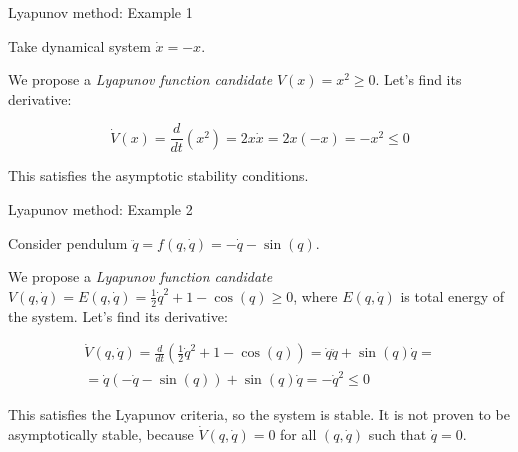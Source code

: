 \documentclass{beamer}
\begin{document}
\begin{frame}{Lyapunov method: Example 1}
\begin{flushleft}

Take dynamical system $\dot{x} = -x$. 

\bigskip

We propose a \emph{Lyapunov function candidate} $V(x) = x^2 \geq 0$. Let's find its derivative:

\begin{equation}
    \dot V(x) = 
    \frac{d}{dt}(  x^2  ) = 
    2x \dot x =
    2x (-x) =
    -x^2 \leq 0
\end{equation}

This satisfies the asymptotic stability conditions.

\end{flushleft}
\end{frame}



\begin{frame}{Lyapunov method: Example 2}
	\begin{flushleft}
		
		Consider pendulum $\ddot{q} = f(q, \dot{q}) = -\dot{q} - \sin(q)$. 
		
		\bigskip
		
		We propose a \emph{Lyapunov function candidate} $V(q, \dot{q}) = E(q, \dot{q}) = \frac{1}{2} \dot{q}^2 + 1 - \cos(q)\geq 0$, where $E(q, \dot{q})$ is total energy of the system. Let's find its derivative:
		
		
		\begin{align}
			\dot V(q, \dot{q}) = 
			\frac{d}{dt} (\frac{1}{2} \dot{q}^2 + 1 - \cos(q)) =
			\dot{q} \ddot{q} + \sin(q)\dot{q} = \\
			=
			\dot{q} (-\dot{q} - \sin(q)) + \sin(q)\dot{q}
			=
			-\dot{q}^2 \leq 0
		\end{align}
		
		This satisfies the Lyapunov criteria, so the system is stable. It is not proven to be asymptotically stable, because $\dot V(q, \dot{q}) = 0$ for all $(q, \dot q)$ such that $\dot q = 0$.
		
	\end{flushleft}
\end{frame}
\end{document}
